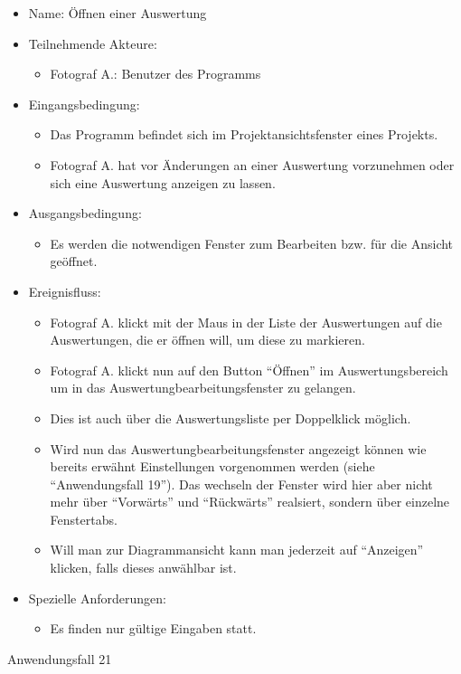 \begin{itemize}
\item Name: Öffnen einer Auswertung
\item Teilnehmende Akteure:
\begin{itemize}
\item Fotograf A.: Benutzer des Programms
\end{itemize}
\item Eingangsbedingung:
\begin{itemize}
\item Das Programm befindet sich im Projektansichtsfenster eines Projekts.
\item Fotograf A. hat vor Änderungen an einer Auswertung vorzunehmen oder sich eine Auswertung anzeigen zu lassen.
\end{itemize}
\item Ausgangsbedingung:
\begin{itemize}
\item Es werden die notwendigen Fenster zum Bearbeiten bzw. für die Ansicht geöffnet.
\end{itemize}
\item Ereignisfluss:
\begin{itemize}
\item Fotograf A. klickt mit der Maus in der Liste der Auswertungen auf die Auswertungen, die er öffnen will, um diese zu markieren.
\item Fotograf A. klickt nun auf den Button "`Öffnen"' im Auswertungsbereich um in das Auswertungbearbeitungsfenster zu gelangen.
\item Dies ist auch über die Auswertungsliste per Doppelklick möglich.
\item Wird nun das Auswertungbearbeitungsfenster angezeigt können wie bereits erwähnt Einstellungen vorgenommen werden (siehe "`Anwendungsfall 19"'). Das wechseln der Fenster wird hier aber nicht mehr über "`Vorwärts"' und "`Rückwärts"' realsiert, sondern über einzelne Fenstertabs.
\item Will man zur Diagrammansicht kann man jederzeit auf "`Anzeigen"' klicken, falls dieses anwählbar ist.
\end{itemize}
\item Spezielle Anforderungen:
\begin{itemize}
\item Es finden nur gültige Eingaben statt.
\end{itemize}
\end{itemize}
 
\begin{description}
\item[Anwendungsfall 21]
\end{description}
 
